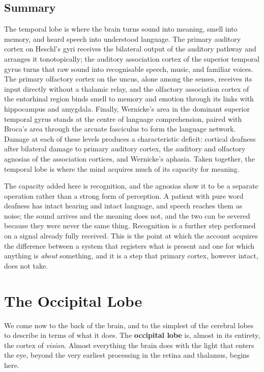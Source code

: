 \documentclass[11pt]{article}
\begin{document}
\subsection{Summary}

The temporal lobe is where the brain turns sound into meaning, smell into memory, and heard speech into understood language. The primary auditory cortex on Heschl's gyri receives the bilateral output of the auditory pathway and arranges it tonotopically; the auditory association cortex of the superior temporal gyrus turns that raw sound into recognisable speech, music, and familiar voices. The primary olfactory cortex on the uncus, alone among the senses, receives its input directly without a thalamic relay, and the olfactory association cortex of the entorhinal region binds smell to memory and emotion through its links with hippocampus and amygdala. Finally, Wernicke's area in the dominant superior temporal gyrus stands at the centre of language comprehension, paired with Broca's area through the arcuate fasciculus to form the language network. Damage at each of these levels produces a characteristic deficit: cortical deafness after bilateral damage to primary auditory cortex, the auditory and olfactory agnosias of the association cortices, and Wernicke's aphasia. Taken together, the temporal lobe is where the mind acquires much of its capacity for meaning.

The capacity added here is recognition, and the agnosias show it to be a separate operation rather than a strong form of perception. A patient with pure word deafness has intact hearing and intact language, and speech reaches them as noise; the sound arrives and the meaning does not, and the two can be severed because they were never the same thing. Recognition is a further step performed on a signal already fully received. This is the point at which the account acquires the difference between a system that registers what is present and one for which anything is \textit{about} something, and it is a step that primary cortex, however intact, does not take.


\section{The Occipital Lobe}

We come now to the back of the brain, and to the simplest of the cerebral lobes to describe in terms of what it does. The \textbf{occipital lobe} is, almost in its entirety, the cortex of \textit{vision}. Almost everything the brain does with the light that enters the eye, beyond the very earliest processing in the retina and thalamus, begins here.
\end{document}
